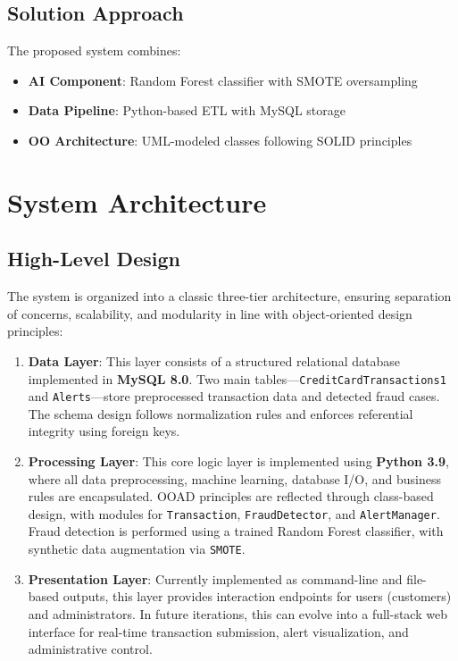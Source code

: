 \documentclass[12pt]{article}
\begin{document}
\subsection{Solution Approach}
The proposed system combines:
\begin{itemize}[leftmargin=*]
    \item \textbf{AI Component}: Random Forest classifier with SMOTE oversampling
    \item \textbf{Data Pipeline}: Python-based ETL with MySQL storage
    \item \textbf{OO Architecture}: UML-modeled classes following SOLID principles
\end{itemize}

\section{System Architecture}

\subsection{High-Level Design}
The system is organized into a classic three-tier architecture, ensuring separation of concerns, scalability, and modularity in line with object-oriented design principles:

\begin{enumerate}[leftmargin=*]
    \item \textbf{Data Layer}: 
    This layer consists of a structured relational database implemented in \textbf{MySQL 8.0}. Two main tables—\texttt{CreditCardTransactions1} and \texttt{Alerts}—store preprocessed transaction data and detected fraud cases. The schema design follows normalization rules and enforces referential integrity using foreign keys.
    
    \item \textbf{Processing Layer}: 
    This core logic layer is implemented using \textbf{Python 3.9}, where all data preprocessing, machine learning, database I/O, and business rules are encapsulated. OOAD principles are reflected through class-based design, with modules for \texttt{Transaction}, \texttt{FraudDetector}, and \texttt{AlertManager}. Fraud detection is performed using a trained Random Forest classifier, with synthetic data augmentation via \texttt{SMOTE}.
    
    \item \textbf{Presentation Layer}: 
    Currently implemented as command-line and file-based outputs, this layer provides interaction endpoints for users (customers) and administrators. In future iterations, this can evolve into a full-stack web interface for real-time transaction submission, alert visualization, and administrative control.
\end{enumerate}
\end{document}
